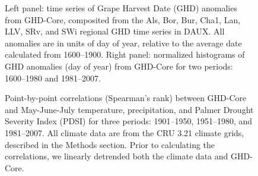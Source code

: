 \documentclass[final]{nature}
\begin{document}

\begin{figure}
\caption{Left panel: time series of Grape Harvest Date (GHD) anomalies from GHD-Core, composited from the Als, Bor, Bur, Cha1, Lan, LLV, SRv, and SWi regional GHD time series in DAUX. All anomalies are in units of day of year, relative to the average date calculated from 1600--1900. Right panel: normalized histograms of GHD anomalies (day of year) from GHD-Core for two periods: 1600--1980 and 1981--2007.}
\end{figure}

\begin{figure}
\caption{Point-by-point correlations (Spearman's rank) between GHD-Core and May-June-July temperature, precipitation, and Palmer Drought Severity Index (PDSI) for three periods: 1901--1950, 1951--1980, and 1981--2007. All climate data are from the CRU 3.21 climate grids, described in the Methods section. Prior to calculating the correlations, we linearly detrended both the climate data and GHD-Core.}
\end{figure}
\end{document}
